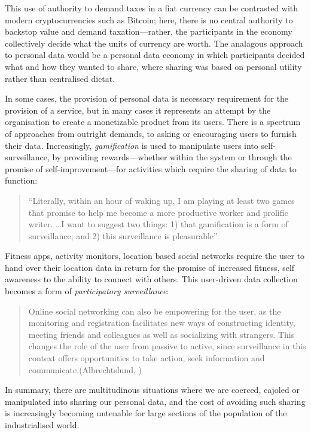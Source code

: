 \documentclass{IOS-Book-Article}     %
\begin{document}
This use of authority to demand taxes in a fiat currency can be contrasted with modern
cryptocurrencies such as Bitcoin; here, there is no central authority to 
backstop value and demand taxation---rather, the participants in the economy collectively decide what the units
of currency are worth. 
The analagous approach to personal data would be a personal data economy in
which participants decided what and how they wanted to share, where sharing was
based on personal utility rather than centralised dictat.

In some cases, the provision of personal data is
necessary requirement for the provision of a service, but in many
cases it represents an attempt by the organisation to create a monetizable product from
its users. There is a spectrum of approaches from outright demands, 
to asking or encouraging users to furnish their data.
Increasingly, \emph{gamification} is used to manipulate
users into self-surveillance, by providing rewards---whether within the system
or through the promise of self-improvement---for activities which require the
sharing of data to function:
\begin{quote}``Literally, within an hour of waking up, I am playing at least two games that promise to help me become a more productive
worker and prolific writer. \ldots I want to suggest two things: 1) that gamification is a form of
surveillance; and 2) this surveillance is
pleasurable''\cite{whitson2013gaming}\end{quote}
Fitness apps, activity monitors, location based social networks require the
user to hand over their location data in return for the promise of increased
fitness, self awareness to the ability to connect with others. 
This user-driven data collection becomes a form of \emph{participatory surveillance}:
\begin{quote}
Online social networking can also be empowering for the user, as the monitoring and 
registration facilitates new ways of constructing identity, meeting friends and colleagues 
as well as socializing with strangers. This changes the role of the user from passive to 
active, since surveillance in this context offers opportunities to take action, seek 
information and communicate.(Albrechtslund, \cite{albrechtslund2008online})
\end{quote} 

In summary, there are multitudinous situations where we are coerced, cajoled or
manipulated into sharing our personal data, and the cost of avoiding such
sharing is increasingly becoming untenable for large sections of the population
of the industrialised world.
\end{document}
